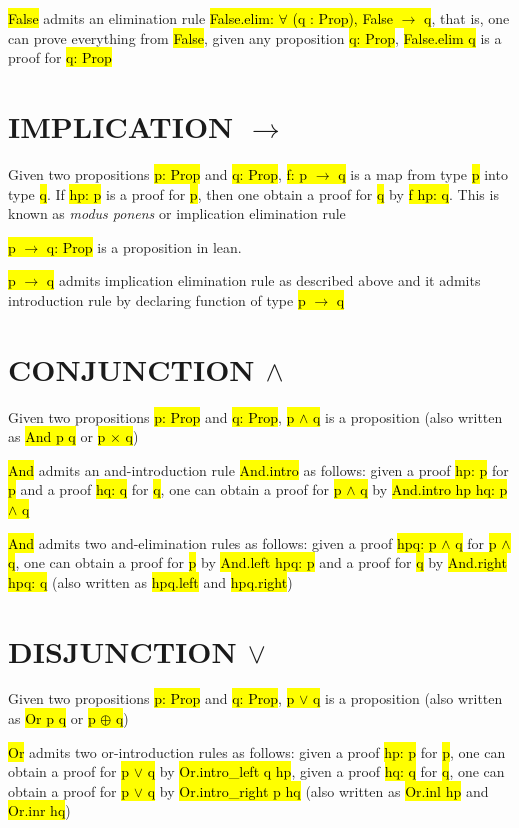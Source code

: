 \hl{False} admits an elimination rule \hl{False.elim: $\forall$ (q : Prop), False $\to$ q}, that is, one can prove everything from \hl{False}, given any proposition \hl{q: Prop}, \hl{False.elim q} is a proof for \hl{q: Prop}

\section{IMPLICATION $\to$}

Given two propositions \hl{p: Prop} and \hl{q: Prop}, \hl{f: p $\to$ q} is a map from type \hl{p} into type \hl{q}. If \hl{hp: p} is a proof for \hl{p}, then one obtain a proof for \hl{q} by \hl{f hp: q}. This is known as \textit{modus ponens} or implication elimination rule

\hl{p $\to$ q: Prop} is a proposition in lean.

\hl{p $\to$ q} admits implication elimination rule as described above and it admits introduction rule by declaring function of type \hl{p $\to$ q}

\section{CONJUNCTION $\land$}

Given two propositions \hl{p: Prop} and \hl{q: Prop}, \hl{p $\land$ q} is a proposition (also written as \hl{And p q} or \hl{p $\times$ q})

\hl{And} admits an and-introduction rule \hl{And.intro} as follows: given a proof \hl{hp: p} for \hl{p} and a proof \hl{hq: q} for \hl{q}, one can obtain a proof for \hl{p $\land$ q} by \hl{And.intro hp hq: p $\land$ q}

\hl{And} admits two and-elimination rules as follows: given a proof \hl{hpq: p $\land$ q} for \hl{p $\land$ q}, one can obtain a proof for \hl{p} by \hl{And.left hpq: p} and a proof for \hl{q} by \hl{And.right hpq: q} (also written as \hl{hpq.left} and \hl{hpq.right})


\section{DISJUNCTION $\lor$}

Given two propositions \hl{p: Prop} and \hl{q: Prop}, \hl{p $\lor$ q} is a proposition (also written as \hl{Or p q} or \hl{p $\oplus$ q})

\hl{Or} admits two or-introduction rules as follows: given a proof \hl{hp: p} for \hl{p}, one can obtain a proof for \hl{p $\lor$ q} by \hl{Or.intro\_left q hp}, given a proof \hl{hq: q} for \hl{q}, one can obtain a proof for \hl{p $\lor$ q} by \hl{Or.intro\_right p hq} (also written as \hl{Or.inl hp} and \hl{Or.inr hq})

